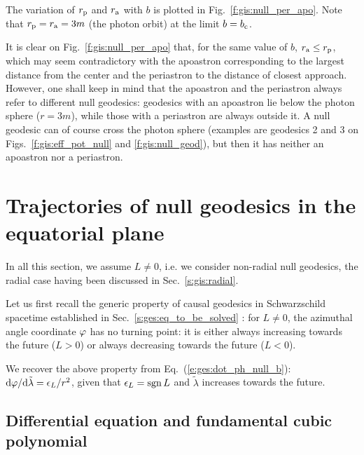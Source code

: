 The variation of $r_{\rm p}$ and $r_{\rm a}$ with $b$ is plotted
in Fig.~\ref{f:gis:null_per_apo}. Note that $r_{\rm p} = r_{\rm a} = 3 m$
(the photon orbit) at the limit $b = b_{\rm c}$.
\begin{remark}
It is clear on Fig.~\ref{f:gis:null_per_apo} that, for the same value of $b$,
$r_{\rm a} \leq r_{\rm p}$, which may seem contradictory with the apoastron
corresponding to the largest distance from the center and the periastron to
the distance of closest approach.
However, one shall keep in mind that the apoastron and the periastron always refer to different null
geodesics: geodesics with an apoastron lie below the photon sphere ($r=3m$), while those
with a periastron are always outside it. A null geodesic can of course cross
the photon sphere (examples are geodesics 2 and 3 on Figs.~\ref{f:gis:eff_pot_null}
and \ref{f:gis:null_geod}), but then it has neither an apoastron nor a periastron.
\end{remark}


\section{Trajectories of null geodesics in the equatorial plane} \label{s:gis:planar_trajectories}

In all this section, we assume $L\not = 0$, i.e. we consider non-radial
null geodesics, the radial case having been discussed in Sec.~\ref{s:gis:radial}.

Let us first recall the generic property of causal geodesics in Schwarzschild
spacetime established in Sec.~\ref{s:ges:eq_to_be_solved} : for $L\not=0$,
the azimuthal angle coordinate $\varphi$ has no turning point: it is either always increasing
towards the future
($L>0$) or always decreasing towards the future ($L<0$).
\begin{remark}
We recover the above property from Eq.~(\ref{e:ges:dot_ph_null_b}):
$\mathrm{d}\varphi/\mathrm{d}\tilde{\lambda} = \epsilon_L/r^2$, given that
$\epsilon_L = \operatorname{sgn} L$ and $\tilde{\lambda}$ increases towards
the future.
\end{remark}

\subsection{Differential equation and fundamental cubic polynomial}
\label{s:gis:cubic_poly}

